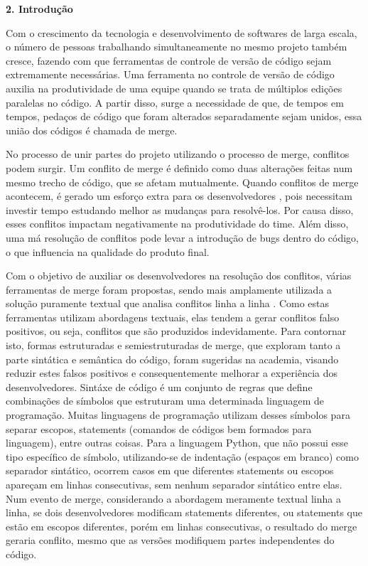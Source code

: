 \begin{flushleft}
	{\textbf{\Large{2. Introdução}}}
\end{flushleft}
\vspace{1cm}

Com o crescimento da tecnologia e desenvolvimento de softwares de larga escala,
o número de pessoas trabalhando simultaneamente no mesmo projeto também cresce,
fazendo com que ferramentas de controle de versão de código sejam extremamente
necessárias. Uma ferramenta no controle de versão de código auxilia na
produtividade de uma equipe quando se trata de múltiplos edições paralelas no
código. A partir disso, surge a necessidade de que, de tempos em tempos,
pedaços de código que foram alterados separadamente sejam unidos, essa união
dos códigos é chamada de merge.

No processo de unir partes do projeto utilizando o processo de merge, conflitos
podem surgir. Um conflito de merge é definido como duas alterações feitas num
mesmo trecho de código, que se afetam mutualmente. Quando conflitos de merge
acontecem, é gerado um esforço extra para os desenvolvedores
\cite{brindescu2020empirical}, pois necessitam investir tempo estudando melhor
as mudanças para resolvê-los. Por causa disso, esses conflitos impactam
negativamente na produtividade do time. Além disso, uma má resolução de
conflitos pode levar a introdução de bugs dentro do código, o que influencia na
qualidade do produto final.

Com o objetivo de auxiliar os desenvolvedores na resolução dos conflitos,
várias ferramentas de merge foram propostas, sendo mais amplamente utilizada a
solução puramente textual que analisa conflitos linha a linha
\cite{khanna2007formal}. Como estas ferramentas utilizam abordagens textuais,
elas tendem a gerar conflitos falso positivos, ou seja, conflitos que são
produzidos indevidamente. Para contornar isto, formas estruturadas e
semiestruturadas de merge, que exploram tanto a parte sintática e semântica do
código, foram sugeridas na academia, visando reduzir estes falsos positivos e
consequentemente melhorar a experiência dos desenvolvedores. Sintáxe de código
é um conjunto de regras que define combinações de símbolos que estruturam uma
determinada linguagem de programação. Muitas linguagens de programação utilizam
desses símbolos para separar escopos, statements (comandos de códigos bem
formados para linguagem), entre outras coisas. Para a linguagem Python, que não
possui esse tipo específico de símbolo, utilizando-se de indentação (espaços em
branco) como separador sintático, ocorrem casos em que diferentes statements ou
escopos apareçam em linhas consecutivas, sem nenhum separador sintático entre
elas. Num evento de merge, considerando a abordagem meramente textual linha a
linha, se dois desenvolvedores modificam statements diferentes, ou statements
que estão em escopos diferentes, porém em linhas consecutivas, o resultado do
merge geraria conflito, mesmo que as versões modifiquem partes independentes do
código.


